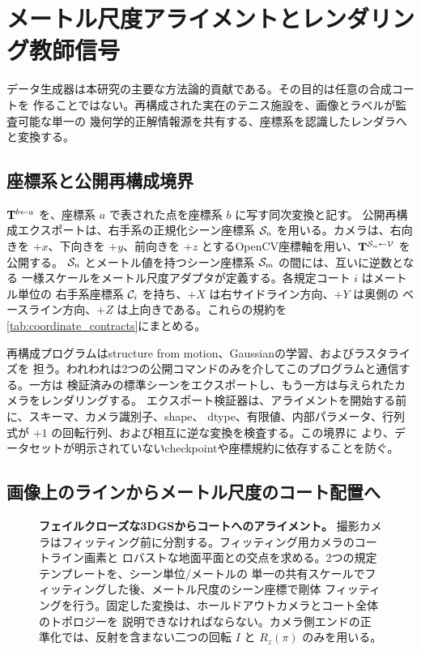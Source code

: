 \section{メートル尺度アライメントとレンダリング教師信号}
\label{sec:render_supervision}

データ生成器は本研究の主要な方法論的貢献である。その目的は任意の合成コートを
作ることではない。再構成された実在のテニス施設を、画像とラベルが監査可能な単一の
幾何学的正解情報源を共有する、座標系を認識したレンダラへと変換する。

\subsection{座標系と公開再構成境界}
\label{sec:frames}

\(\mathbf{T}^{b\leftarrow a}\) を、座標系 \(a\) で表された点を座標系 \(b\) に写す同次変換と記す。
公開再構成エクスポートは、右手系の正規化シーン座標系
\(\mathcal{S}_n\) を用いる。カメラは、右向きを \(+x\)、下向きを \(+y\)、前向きを
\(+z\) とするOpenCV座標軸を用い、\(\mathbf{T}^{\mathcal{S}_n\leftarrow \mathcal{V}}\) を公開する。
\(\mathcal{S}_n\) とメートル値を持つシーン座標系 \(\mathcal{S}_m\) の間には、互いに逆数となる
一様スケールをメートル尺度アダプタが定義する。各規定コート \(i\) はメートル単位の
右手系座標系 \(\mathcal{C}_i\) を持ち、\(+X\) は右サイドライン方向、\(+Y\) は奥側の
ベースライン方向、\(+Z\) は上向きである。これらの規約を
\cref{tab:coordinate_contracts}にまとめる。

再構成プログラムはstructure from motion、Gaussianの学習、およびラスタライズを
担う。われわれは2つの公開コマンドのみを介してこのプログラムと通信する。一方は
検証済みの標準シーンをエクスポートし、もう一方は与えられたカメラをレンダリングする。
エクスポート検証器は、アライメントを開始する前に、スキーマ、カメラ識別子、shape、
dtype、有限値、内部パラメータ、行列式が $+1$ の回転行列、および相互に逆な変換を検査する。この境界に
より、データセットが明示されていないcheckpointや座標規約に依存することを防ぐ。



\subsection{画像上のラインからメートル尺度のコート配置へ}
\label{sec:alignment}

\begin{figure}[t]
  \centering
  \resizebox{\linewidth}{!}{}
  \caption{\textbf{フェイルクローズな3DGSからコートへのアライメント。}
  撮影カメラはフィッティング前に分割する。フィッティング用カメラのコートライン画素と
  ロバストな地面平面との交点を求める。2つの規定テンプレートを、シーン単位/メートルの
  単一の共有スケールでフィッティングした後、メートル尺度のシーン座標で剛体
  フィッティングを行う。固定した変換は、ホールドアウトカメラとコート全体のトポロジーを
  説明できなければならない。カメラ側エンドの正準化では、反射を含まない二つの回転 \(I\) と
  \(R_z(\pi)\) のみを用いる。}
  \label{fig:alignment}
\end{figure}

